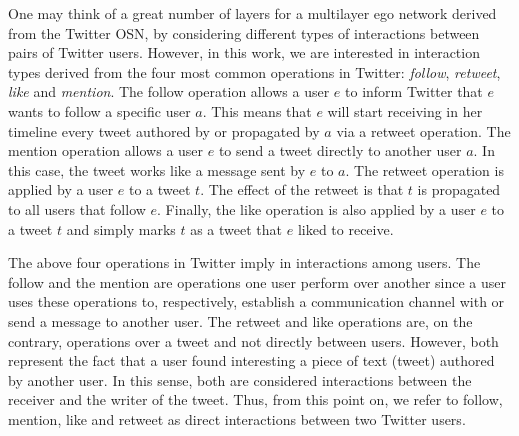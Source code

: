 
One may think of  a great number of layers for a multilayer ego network derived from the Twitter OSN, by considering different types of  interactions between pairs of Twitter users. However, in this work, we are interested  in interaction types derived from the four most common  operations  in Twitter:   {\em follow}, {\em retweet}, {\em like} and {\em mention}. The follow operation allows a user $e$ to inform Twitter that $e$ wants  to follow a specific user $a$. This means that $e$ will start receiving in her timeline every tweet authored by or propagated by $a$ via a retweet operation. The mention operation allows a  user $e$ to send a tweet directly to another user $a$. In this case, the tweet works like a message sent by $e$ to $a$. The retweet operation is applied by a user $e$ to a tweet $t$. The effect of the retweet is that $t$ is propagated to all users that follow $e$.  Finally, the like operation is also applied by a user $e$ to a tweet $t$ and simply marks $t$ as a tweet that $e$ liked to receive. 
 
The above four operations in Twitter imply in interactions among users. The follow and the mention are  operations one user perform over another since a user  uses these operations to, respectively,  establish  a communication channel with  or  send a message to  another user. The retweet and like operations are, on the contrary,  operations over a tweet and not directly between users. However, both represent the fact that a user found interesting a piece of text (tweet) authored by another user. In this sense, both are considered  interactions between the receiver and the  writer of the tweet. Thus, from this point on, we refer to follow, mention, like and retweet as  direct interactions between two Twitter users. 
 
